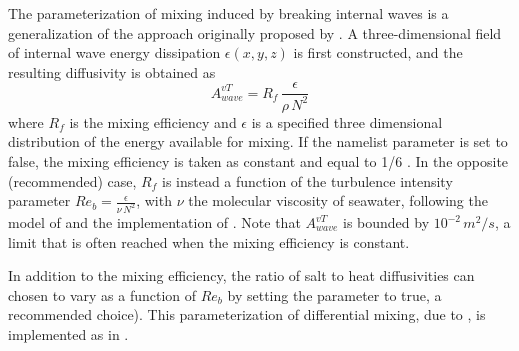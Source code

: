 \documentclass[NEMO_book]{subfiles}
\begin{document}

The parameterization of mixing induced by breaking internal waves is a generalization 
of the approach originally proposed by \citet{St_Laurent_al_GRL02}. 
A three-dimensional field of internal wave energy dissipation $\epsilon(x,y,z)$ is first constructed, 
and the resulting diffusivity is obtained as 
\begin{equation} \label{Eq_Kwave}
A^{vT}_{wave} =  R_f \,\frac{ \epsilon }{ \rho \, N^2 }
\end{equation}
where $R_f$ is the mixing efficiency and $\epsilon$ is a specified three dimensional distribution 
of the energy available for mixing. If the  namelist parameter is set to false, 
the mixing efficiency is taken as constant and equal to 1/6 \citep{Osborn_JPO80}. 
In the opposite (recommended) case, $R_f$ is instead a function of the turbulence intensity parameter 
$Re_b = \frac{ \epsilon}{\nu \, N^2}$, with $\nu$ the molecular viscosity of seawater, 
following the model of \cite{Bouffard_Boegman_DAO2013} 
and the implementation of \cite{de_lavergne_JPO2016_efficiency}.
Note that $A^{vT}_{wave}$ is bounded by $10^{-2}\,m^2/s$, a limit that is often reached when the mixing efficiency is constant.

In addition to the mixing efficiency, the ratio of salt to heat diffusivities can chosen to vary 
as a function of $Re_b$ by setting the  parameter to true, a recommended choice). 
This parameterization of differential mixing, due to \cite{Jackson_Rehmann_JPO2014}, 
is implemented as in \cite{de_lavergne_JPO2016_efficiency}.
\end{document}
